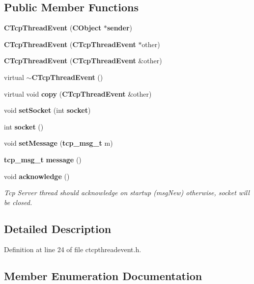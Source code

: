 \subsection*{Public Member Functions}
\begin{DoxyCompactItemize}
\item 
{\bf C\+Tcp\+Thread\+Event} ({\bf C\+Object} $\ast${\bf sender})
\item 
{\bf C\+Tcp\+Thread\+Event} ({\bf C\+Tcp\+Thread\+Event} $\ast$other)
\item 
{\bf C\+Tcp\+Thread\+Event} ({\bf C\+Tcp\+Thread\+Event} \&other)
\item 
virtual {\bf $\sim$\+C\+Tcp\+Thread\+Event} ()
\item 
virtual void {\bf copy} ({\bf C\+Tcp\+Thread\+Event} \&other)
\item 
void {\bf set\+Socket} (int {\bf socket})
\item 
int {\bf socket} ()
\item 
void {\bf set\+Message} ({\bf tcp\+\_\+msg\+\_\+t} m)
\item 
{\bf tcp\+\_\+msg\+\_\+t} {\bf message} ()
\item 
void {\bf acknowledge} ()
\begin{DoxyCompactList}\small\item\em Tcp Server thread should acknowledge on startup (msg\+New) otherwise, socket will be closed. \end{DoxyCompactList}\end{DoxyCompactItemize}


\subsection{Detailed Description}


Definition at line 24 of file ctcpthreadevent.\+h.



\subsection{Member Enumeration Documentation}
